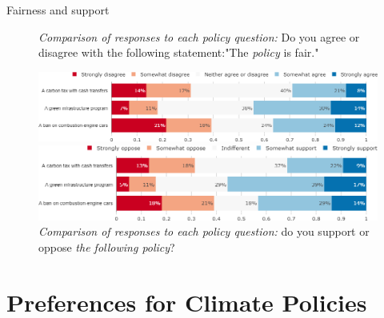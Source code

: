 \documentclass[aspectratio=169,9pt,dvipsnames]{beamer}
\begin{document}
\begin{frame}{Fairness and support}%
\begin{figure}[h!]
\vspace{-.1cm}
\centering
\caption{\textit{Comparison of responses to each policy question:} Do you agree or disagree with the following statement:"The \textit{policy} is fair."}
\includegraphics[width=.8\textwidth]{../figures/DK/policies_fair_DK.png}
\vspace{-.1cm}
\centering
\caption{\textit{Comparison of responses to each policy question:} do you support or oppose \textit{the following policy}?}
\includegraphics[width=.8\textwidth]{../figures/DK/policies_support_DK.png}
\end{figure}


\end{frame}

\section{Preferences for Climate Policies}
\end{document}
